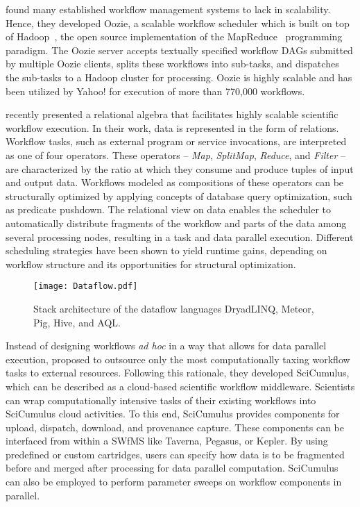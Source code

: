 \citet{Islam2012} found many established workflow management systems to lack in scalability. Hence, they developed Oozie, a scalable workflow scheduler which is built on top of Hadoop~\citep{White10}, the open source implementation of the MapReduce~\citep{Dean08} programming paradigm. The Oozie server accepts textually specified workflow DAGs submitted by multiple Oozie clients, splits these workflows into sub-tasks, and dispatches the sub-tasks to a Hadoop cluster for processing. Oozie is highly scalable and has been utilized by Yahoo! for execution of more than 770,000 workflows.

\citet{Ogasawara11} recently presented a relational algebra that facilitates highly scalable scientific workflow execution. In their work, data is represented in the form of relations. Workflow tasks, such as external program or service invocations, are interpreted as one of four operators. These operators -- \textit{Map}, \textit{SplitMap}, \textit{Reduce}, and \textit{Filter} -- are characterized by the ratio at which they consume and produce tuples of input and output data. Workflows modeled as compositions of these operators can be structurally optimized by applying concepts of database query optimization, such as predicate pushdown. The relational view on data enables the scheduler to automatically distribute fragments of the workflow and parts of the data among several processing nodes, resulting in a task and data parallel execution. Different scheduling strategies have been shown to yield runtime gains, depending on workflow structure and its opportunities for structural optimization.

\begin{figure*}[t]
  \centering
  \texttt{[image: Dataflow.pdf]}
  \caption[...]{Stack architecture of the dataflow languages DryadLINQ, Meteor, Pig, Hive, and AQL.}
  \label{dataflow}
\end{figure*}

Instead of designing workflows \textit{ad hoc} in a way that allows for data parallel execution, \citet{DeOliveira2010} proposed to outsource only the most computationally taxing workflow tasks to external resources. Following this rationale, they developed \mbox{SciCumulus}, which can be described as a cloud-based scientific workflow middleware. Scientists can wrap computationally intensive tasks of their existing workflows into \mbox{SciCumulus} cloud activities. To this end, \mbox{SciCumulus} provides components for upload, dispatch, download, and provenance capture. These components can be interfaced from within a SWfMS like Taverna, Pegasus, or Kepler. By using predefined or custom cartridges, users can specify how data is to be fragmented before and merged after processing for data parallel computation. \mbox{SciCumulus} can also be employed to perform parameter sweeps on workflow components in parallel.


